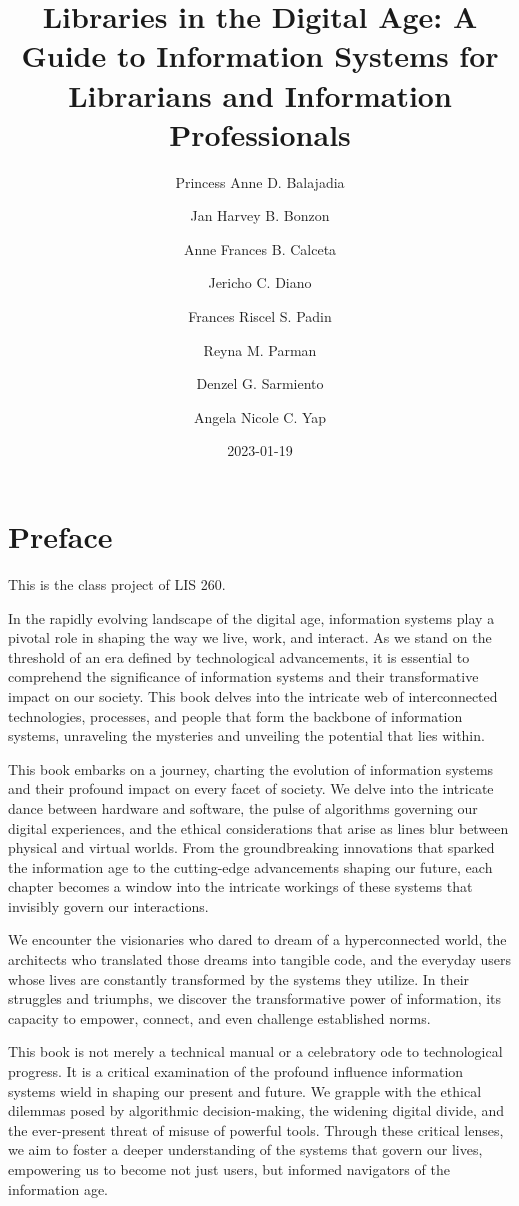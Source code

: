 \documentclass[
  letterpaper,
  DIV=11,
  numbers=noendperiod]{scrreprt}
\title{Libraries in the Digital Age: A Guide to Information Systems for
Librarians and Information Professionals}
\author{Princess Anne D. Balajadia \and Jan Harvey B. Bonzon \and Anne
Frances B. Calceta \and Jericho C. Diano \and Frances Riscel S.
Padin \and Reyna M. Parman \and Denzel G. Sarmiento \and Angela Nicole
C. Yap}
\date{2023-01-19}
\renewcommand*\contentsname{Table of contents}
\newcommand\contentsname{Table of contents}
\begin{document}
\maketitle

\renewcommand*\contentsname{Table of contents}
{
\hypersetup{linkcolor=}
\setcounter{tocdepth}{2}
\tableofcontents
}

\chapter*{Preface}\label{preface}


This is the class project of LIS 260.

In the rapidly evolving landscape of the digital age, information
systems play a pivotal role in shaping the way we live, work, and
interact. As we stand on the threshold of an era defined by
technological advancements, it is essential to comprehend the
significance of information systems and their transformative impact on
our society. This book delves into the intricate web of interconnected
technologies, processes, and people that form the backbone of
information systems, unraveling the mysteries and unveiling the
potential that lies within.

This book embarks on a journey, charting the evolution of information
systems and their profound impact on every facet of society. We delve
into the intricate dance between hardware and software, the pulse of
algorithms governing our digital experiences, and the ethical
considerations that arise as lines blur between physical and virtual
worlds. From the groundbreaking innovations that sparked the information
age to the cutting-edge advancements shaping our future, each chapter
becomes a window into the intricate workings of these systems that
invisibly govern our interactions.

We encounter the visionaries who dared to dream of a hyperconnected
world, the architects who translated those dreams into tangible code,
and the everyday users whose lives are constantly transformed by the
systems they utilize. In their struggles and triumphs, we discover the
transformative power of information, its capacity to empower, connect,
and even challenge established norms.

This book is not merely a technical manual or a celebratory ode to
technological progress. It is a critical examination of the profound
influence information systems wield in shaping our present and future.
We grapple with the ethical dilemmas posed by algorithmic
decision-making, the widening digital divide, and the ever-present
threat of misuse of powerful tools. Through these critical lenses, we
aim to foster a deeper understanding of the systems that govern our
lives, empowering us to become not just users, but informed navigators
of the information age.
\end{document}
